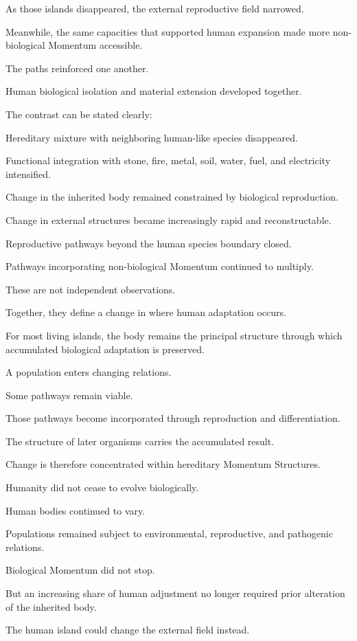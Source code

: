 As those islands disappeared, the external reproductive field narrowed.

Meanwhile, the same capacities that supported human expansion made more non-biological Momentum accessible.

The paths reinforced one another.

Human biological isolation and material extension developed together.

The contrast can be stated clearly:

Hereditary mixture with neighboring human-like species disappeared.

Functional integration with stone, fire, metal, soil, water, fuel, and electricity intensified.

Change in the inherited body remained constrained by biological reproduction.

Change in external structures became increasingly rapid and reconstructable.

Reproductive pathways beyond the human species boundary closed.

Pathways incorporating non-biological Momentum continued to multiply.

These are not independent observations.

Together, they define a change in where human adaptation occurs.

For most living islands, the body remains the principal structure through which accumulated biological adaptation is preserved.

A population enters changing relations.

Some pathways remain viable.

Those pathways become incorporated through reproduction and differentiation.

The structure of later organisms carries the accumulated result.

Change is therefore concentrated within hereditary Momentum Structures.

Humanity did not cease to evolve biologically.

Human bodies continued to vary.

Populations remained subject to environmental, reproductive, and pathogenic relations.

Biological Momentum did not stop.

But an increasing share of human adjustment no longer required prior alteration of the inherited body.

The human island could change the external field instead.

